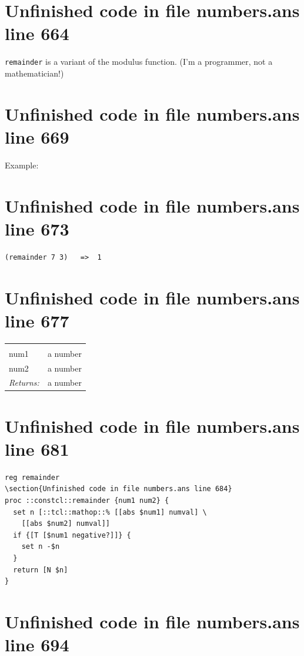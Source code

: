 \documentclass[twoside,9pt]{report}
\begin{document}
\section{Unfinished code in file numbers.ans line 664}


\texttt{remainder} is a variant of the modulus function. (I'm a programmer, not a mathematician!)

\section{Unfinished code in file numbers.ans line 669}


Example:

\section{Unfinished code in file numbers.ans line 673}
\begin{verbatim}
(remainder 7 3)   =>  1
\end{verbatim}
\section{Unfinished code in file numbers.ans line 677}
\noindent\begin{tabular}{ |p{1.9cm} p{8cm}| }
\hline
\rowcolor[HTML]{CCCCCC} \multicolumn{2}{|l|}{\bf remainder (public)} \\
num1 & a number \\
num2 & a number \\
\textit{Returns:} & a number \\
\hline
\end{tabular}
\section{Unfinished code in file numbers.ans line 681}
\begin{lstlisting}
reg remainder
\section{Unfinished code in file numbers.ans line 684}
proc ::constcl::remainder {num1 num2} {
  set n [::tcl::mathop::% [[abs $num1] numval] \
    [[abs $num2] numval]]
  if {[T [$num1 negative?]]} {
    set n -$n
  }
  return [N $n]
}
\end{lstlisting}
\section{Unfinished code in file numbers.ans line 694}
\end{document}
